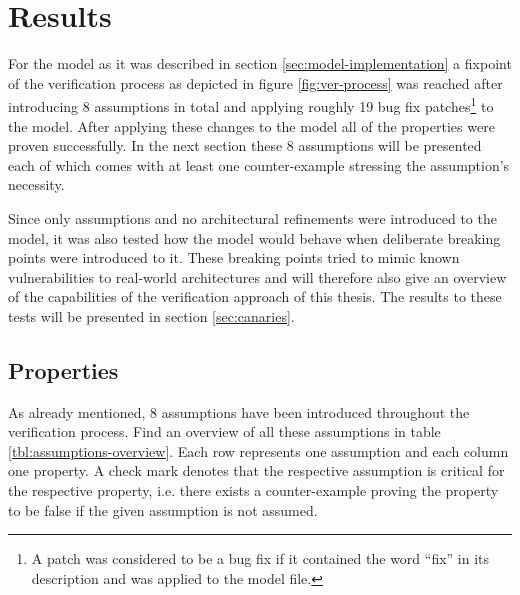 
\section{Results}

For the model as it was described in section \ref{sec:model-implementation} a fixpoint of the verification process as depicted in figure \ref{fig:ver-process} was reached after introducing 8 assumptions in total and applying roughly 19 bug fix patches\footnote{%
    A patch was considered to be a bug fix if it contained the word \enquote{fix} in its description and was applied to the model file.
} to the model.
After applying these changes to the model all of the properties were proven successfully.
In the next section these 8 assumptions will be presented each of which comes with at least one counter-example stressing the assumption's necessity.

Since only assumptions and no architectural refinements were introduced to the model, it was also tested how the model would behave when deliberate breaking points were introduced to it.
These breaking points tried to mimic known vulnerabilities to real-world architectures and will therefore also give an overview of the capabilities of the verification approach of this thesis.
The results to these tests will be presented in section \ref{sec:canaries}.

\subsection{Properties}

As already mentioned, 8 assumptions have been introduced throughout the verification process.
Find an overview of all these assumptions in table \ref{tbl:assumptions-overview}.
Each row represents one assumption and each column one property.
A check mark denotes that the respective assumption is critical for the respective property, i.e. there exists a counter-example proving the property to be false if the given assumption is not assumed.

